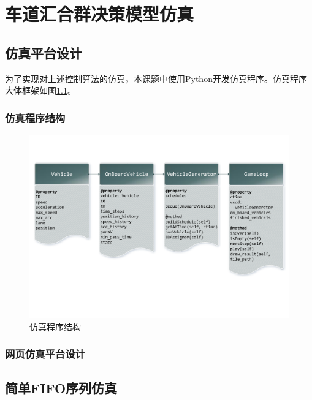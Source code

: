 \chapter{车道汇合群决策模型仿真}

\section{仿真平台设计}
为了实现对上述控制算法的仿真，本课题中使用{\ttfamily Python}开发仿真程序。仿真程序大体框架如图\ref{fig:ss}。
\subsection{仿真程序结构}
\begin{figure}
\centering
\includegraphics[width=15cm,trim={0 4cm 0 2cm},clip]{figures/software_structure.pdf}
\caption{仿真程序结构}
\label{fig:ss}
\end{figure}
\subsection{网页仿真平台设计}


\section{简单FIFO序列仿真}
